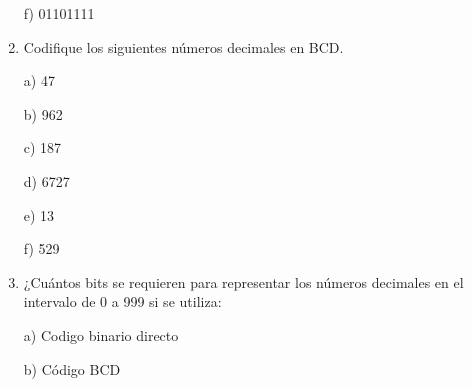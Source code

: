 \documentclass[a4paper, 12pt]{article}
\newcommand{\Aspace}{0.2cm}
\begin{document}
\begin{enumerate}
            \vspace{\Aspace} \par
            f) 01101111
            \\ { \color{azul}  }


        \item Codifique los siguientes números decimales en BCD.
            \vspace{\Aspace} \par
            a) 47
            \\ { \color{azul}  }

            \vspace{\Aspace} \par
            b) 962
            \\ { \color{azul}  }

            \vspace{\Aspace} \par
            c) 187
            \\ { \color{azul}  }

            \vspace{\Aspace} \par
            d) 6727
            \\ { \color{azul}  }

            \vspace{\Aspace} \par
            e) 13
            \\ { \color{azul}  }

            \vspace{\Aspace} \par
            f) 529
            \\ { \color{azul}  }


        \item ¿Cuántos bits se requieren para representar los números decimales en el intervalo de 0 a 999 si se utiliza:
            \vspace{\Aspace} \par
            a) Codigo binario directo
            \\ { \color{azul}  }

            \vspace{\Aspace} \par
            b) Código BCD
            \\ { \color{azul}  }


\end{enumerate}
\end{document}
